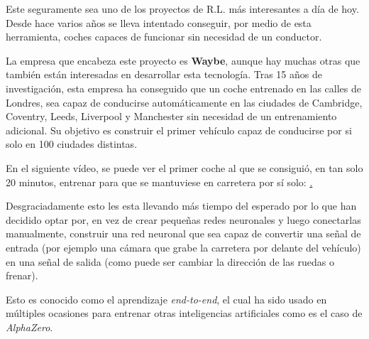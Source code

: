 Este seguramente sea uno de los proyectos de R.L. más interesantes a día de hoy. Desde hace varios años se lleva intentado conseguir, por medio de esta herramienta, coches capaces de funcionar sin necesidad de un conductor.

La empresa que encabeza este proyecto es \textbf{Waybe}\cite{Wayve}, aunque hay muchas otras que también están interesadas en desarrollar esta tecnología. Tras 15 años de investigación, esta empresa ha conseguido que un coche entrenado en las calles de Londres, sea capaz de conducirse automáticamente en las ciudades de Cambridge, Coventry, Leeds, Liverpool y Manchester sin necesidad de un entrenamiento adicional. Su objetivo es construir el primer vehículo capaz de conducirse por si solo en 100 ciudades distintas.

En el siguiente vídeo, se puede ver el primer coche al que se consiguió, en tan solo 20 minutos, entrenar para que se mantuviese en carretera por sí solo:
\href{https://youtu.be/eRwTbRtnT1I}.

Desgraciadamente esto les esta llevando más tiempo del esperado por lo que han decidido optar por, en vez de crear pequeñas redes neuronales y luego conectarlas manualmente, construir una red neuronal que sea capaz de convertir una señal de entrada (por ejemplo una cámara que grabe la carretera por delante del vehículo) en una señal de salida (como puede ser cambiar la dirección de las ruedas o frenar).

Esto es conocido como el aprendizaje \textit{end-to-end}\cite{end_to_end}, el cual ha sido usado en múltiples ocasiones para entrenar otras inteligencias artificiales como es el caso de \textit{AlphaZero}\cite{AlphaZero}.
